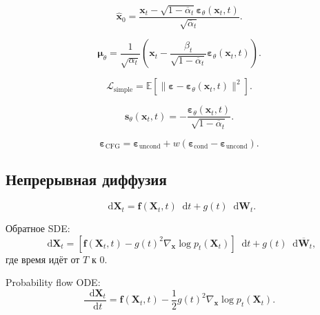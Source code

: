\documentclass[12pt,a4paper]{article}
\theoremstyle{definition}
\newcommand{\E}{\mathbb{E}}
\newcommand{\dd}{\mathop{}\!\mathrm{d}}
\newcommand{\eps}{\varepsilon}
\newcommand{\1}{\mathbf{1}}
\begin{document}
\[
    \widehat{\bm{x}}_0
    =
    \frac{
        \bm{x}_t
        -
        \sqrt{1-\overline{\alpha}_t}
        \bm{\eps}_\theta(\bm{x}_t,t)
    }{
        \sqrt{\overline{\alpha}_t}
    }.
\]

\[
    \bm{\mu}_\theta
    =
    \frac{1}{\sqrt{\alpha_t}}
    \left(
        \bm{x}_t
        -
        \frac{\beta_t}
             {\sqrt{1-\overline{\alpha}_t}}
        \bm{\eps}_\theta(\bm{x}_t,t)
    \right).
\]

\[
    \mathcal{L}_{\text{simple}}
    =
    \E
    \left[
        \|\bm{\eps}
        -
        \bm{\eps}_\theta(\bm{x}_t,t)\|^2
    \right].
\]

\[
    \bm{s}_\theta(\bm{x}_t,t)
    =
    -
    \frac{
        \bm{\eps}_\theta(\bm{x}_t,t)
    }{
        \sqrt{1-\overline{\alpha}_t}
    }.
\]

\[
    \bm{\eps}_{\text{CFG}}
    =
    \bm{\eps}_{\text{uncond}}
    +
    w
    (\bm{\eps}_{\text{cond}}
    -
    \bm{\eps}_{\text{uncond}}).
\]

\subsection*{Непрерывная диффузия}

\[
    \dd\bm{X}_t
    =
    \bm{f}(\bm{X}_t,t)\dd t
    +
    g(t)\dd\bm{W}_t.
\]

Обратное SDE:
\[
    \dd\bm{X}_t
    =
    \left[
        \bm{f}(\bm{X}_t,t)
        -
        g(t)^2\nabla_{\bm{x}}\log p_t(\bm{X}_t)
    \right]\dd t
    +
    g(t)\dd\overline{\bm{W}}_t,
\]
где время идёт от $T$ к $0$.

Probability flow ODE:
\[
    \frac{\dd\bm{X}_t}{\dd t}
    =
    \bm{f}(\bm{X}_t,t)
    -
    \frac{1}{2}g(t)^2
    \nabla_{\bm{x}}\log p_t(\bm{X}_t).
\]
\end{document}
